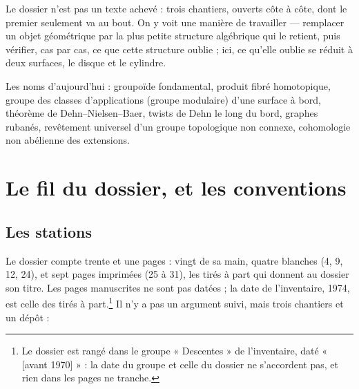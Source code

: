 \documentclass[11pt,a4paper]{article}
\begin{document}
\begin{resume}
Le dossier n'est pas un texte achevé : trois chantiers, ouverts côte à côte,
dont le premier seulement va au bout. On y voit une manière de travailler —
remplacer un objet géométrique par la plus petite structure algébrique qui le
retient, puis vérifier, cas par cas, ce que cette structure oublie ; ici, ce
qu'elle oublie se réduit à deux surfaces, le disque et le cylindre.

Les noms d'aujourd'hui : groupoïde fondamental, produit fibré homotopique,
groupe des classes d'applications (groupe modulaire) d'une surface à bord,
théorème de Dehn--Nielsen--Baer, twists de Dehn le long du bord, graphes
rubanés, revêtement universel d'un groupe topologique non connexe,
cohomologie non abélienne des extensions.

\end{resume}

\section*{Le fil du dossier, et les conventions}

\subsection*{Les stations}

Le dossier compte trente et une pages : vingt de sa main, quatre blanches (4,
9, 12, 24), et sept pages imprimées (25 à 31), les tirés à part qui donnent au
dossier son titre. Les pages manuscrites ne sont pas datées ; la date de
l'inventaire, 1974, est celle des tirés à part.\footnote{Le dossier est rangé
dans le groupe « Descentes » de l'inventaire, daté « [avant 1970] » : la date
du groupe et celle du dossier ne s'accordent pas, et rien dans les pages ne
tranche.} Il n'y a pas un argument suivi, mais trois chantiers et un dépôt :
\end{document}
